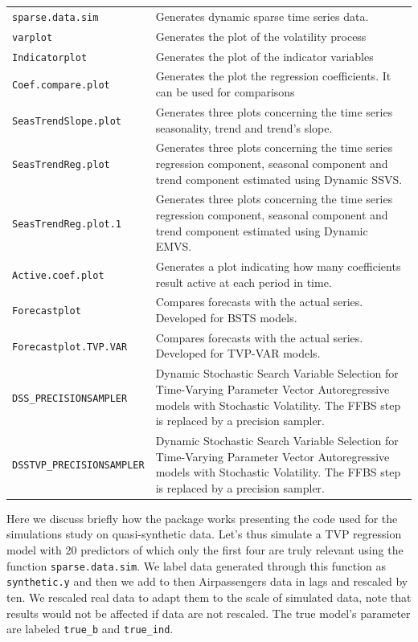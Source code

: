 \documentclass[
  12pt,
]{book}
\theoremstyle{break}
\theoremstyle{nonumberplain}
\begin{document}
\newpage
\begin{table}[h!]
\begin{tabularx}{\textwidth}{|l|X|}
\texttt{sparse.data.sim} & Generates dynamic sparse time series data.\\
\texttt{varplot} & Generates the plot of the volatility process \\
\texttt{Indicatorplot} & Generates the plot of the indicator variables \\
\texttt{Coef.compare.plot} & Generates the plot the regression coefficients. It can be used for comparisons \\
\texttt{SeasTrendSlope.plot} & Generates three plots concerning the time series seasonality, trend and trend's slope. \\
\texttt{SeasTrendReg.plot} & Generates three plots concerning the time series regression component, seasonal component and trend component estimated using Dynamic SSVS.\\
\texttt{SeasTrendReg.plot.1} &  Generates three plots concerning the time series regression component, seasonal component and trend component estimated using Dynamic EMVS.\\
\texttt{Active.coef.plot} & Generates a plot indicating how many coefficients result active at each period in time. \\
\texttt{Forecastplot} & Compares forecasts with the actual series. Developed for BSTS models. \\
\texttt{Forecastplot.TVP.VAR} & Compares forecasts with the actual series. Developed for TVP-VAR models. \\
\texttt{DSS\_PRECISIONSAMPLER} & Dynamic Stochastic Search Variable Selection for Time-Varying Parameter Vector Autoregressive models with Stochastic Volatility. The FFBS step is replaced by a precision sampler.\\
\texttt{DSSTVP\_PRECISIONSAMPLER} & Dynamic Stochastic Search Variable Selection for Time-Varying Parameter Vector Autoregressive models with Stochastic Volatility. The FFBS step is replaced by a precision sampler.
\end{tabularx}
\end{table}

\newpage

Here we discuss briefly how the package works presenting the code used
for the simulations study on quasi-synthetic data. Let's thus simulate a
TVP regression model with 20 predictors of which only the first four are
truly relevant using the function \texttt{sparse.data.sim}. We label
data generated through this function as \texttt{synthetic.y} and then we
add to then Airpassengers data in lags and rescaled by ten. We rescaled
real data to adapt them to the scale of simulated data, note that
results would not be affected if data are not rescaled. The true model's
parameter are labeled \texttt{true\_b} and \texttt{true\_ind}.
\end{document}
